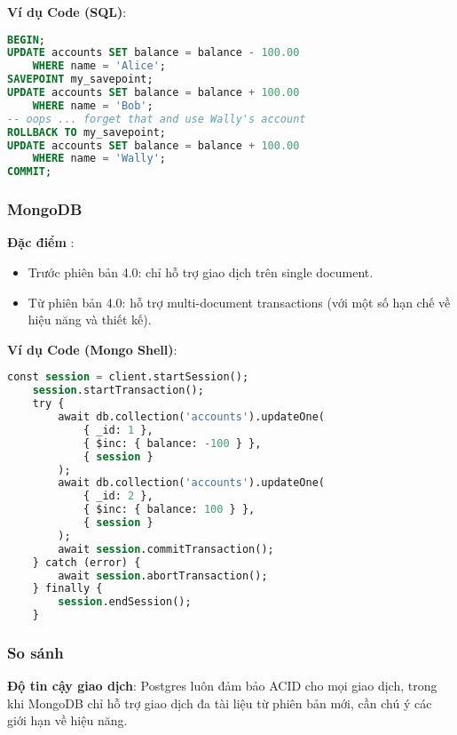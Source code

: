 \textbf{Ví dụ Code (SQL)}:

\begin{lstlisting}[language=sql]
BEGIN;
UPDATE accounts SET balance = balance - 100.00
    WHERE name = 'Alice';
SAVEPOINT my_savepoint;
UPDATE accounts SET balance = balance + 100.00
    WHERE name = 'Bob';
-- oops ... forget that and use Wally's account
ROLLBACK TO my_savepoint;
UPDATE accounts SET balance = balance + 100.00
    WHERE name = 'Wally';
COMMIT;
\end{lstlisting}


\subsubsection{MongoDB}

\textbf{Đặc điểm} : 
\begin{itemize}
    \item Trước phiên bản 4.0: chỉ hỗ trợ giao dịch trên single document.
    \item Từ phiên bản 4.0: hỗ trợ multi-document transactions (với một số hạn chế về hiệu năng và thiết kế).
\end{itemize}

\noindent
\textbf{Ví dụ Code (Mongo Shell)}:
    \begin{lstlisting}[language=sql]
    const session = client.startSession();
    session.startTransaction();
    try {
        await db.collection('accounts').updateOne(
            { _id: 1 },
            { $inc: { balance: -100 } },
            { session }
        );
        await db.collection('accounts').updateOne(
            { _id: 2 },
            { $inc: { balance: 100 } },
            { session }
        );
        await session.commitTransaction();
    } catch (error) {
        await session.abortTransaction();
    } finally {
        session.endSession();
    }
    \end{lstlisting}

\subsubsection{So sánh}
\textbf{Độ tin cậy giao dịch}: Postgres luôn đảm bảo ACID cho mọi giao dịch, trong khi MongoDB chỉ hỗ trợ giao dịch đa tài liệu từ phiên bản mới, cần chú ý các giới hạn về hiệu năng.
